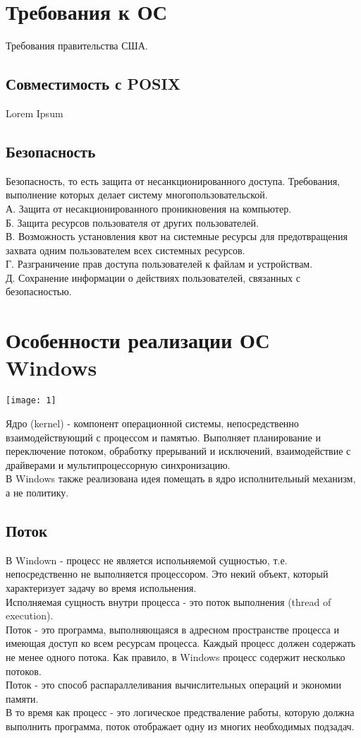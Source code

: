 \documentclass[a4paper]{article}
\begin{document}
\section*{Требования к ОС}
\setcounter{section}{2}
Требования правительства США.
\subsection{Совместимость с POSIX}%
\setcounter{subsection}{6}
Lorem Ipsum
\subsection{Безопасность}%
\setcounter{subsection}{7}
Безопасность, то есть защита от несанкционированного доступа. Требования, выполнение которых делает систему многопользовательской.\\
А. Защита от несакционированного проникновения на компьютер.\\
Б. Защита ресурсов пользователя от других пользователей.\\
В. Возможность установления квот на системные ресурсы для предотвращения захвата одним пользователем всех системных ресурсов.\\
Г. Разграничение прав доступа пользователей к файлам и устройствам.\\
Д. Сохранение информации о действиях пользователей, связанных с безопасностью.\\
\section{Особенности реализации ОС Windows}
\setcounter{section}{3}
\setcounter{subsection}{0}
\begin{center}	
	\texttt{[image: 1]}
\end{center}
Ядро (kernel) - компонент операционной системы, непосредственно взаимодействующий с процессом и памятью. Выполняет планирование и переключение потоком, обработку прерываний и исключений, взаимодействие с драйверами и мультипроцессорную синхронизацию.\\
В Windows также реализована идея помещать в ядро исполнительный механизм, а не политику.\\
\subsection{Поток}%
В Windown - процесс не является испольняемой сущностью, т.е. непосредственно не выполняется процессором. Это некий объект, который характеризует задачу во время испольнения.\\
Исполняемая сущность внутри процесса - это поток выполнения (thread of execution).\\
Поток - это программа, выполняющаяся в адресном пространстве процесса и имеющая доступ ко всем ресурсам процесса. Каждый процесс должен содержать не менее одного потока. Как правило, в Windows процесс содержит несколько потоков.\\
Поток - это способ распараллеливания вычислительных операций и экономии памяти.\\
В то время как процесс - это логическое предстваление работы, которую должна выполнить программа, поток отображает одну из многих необходимых подзадач.\\
\end{document}
